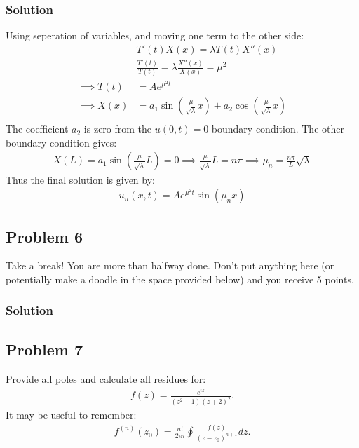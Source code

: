 \subsubsection*{Solution}
Using seperation of variables, and moving one term to the other side:
\begin{align*}
    &T'(t)X(x) = \lambda T(t)X''(x)\\
    &\frac{T'(t)}{T(t)} = \lambda \frac{X''(x)}{X(x)} = \mu^2\\
    \implies T(t) &= Ae^{\mu^2 t}\\
    \implies X(x) &= a_1\sin\left(\frac{\mu}{\sqrt{\lambda}} x\right) + a_2\cos\left(\frac{\mu}{\sqrt{\lambda}} x\right)\\
\end{align*}The coefficient $a_2$ is zero from the $u(0,t) = 0$ boundary condition. The other boundary condition gives:
\begin{align*}
    X(L) = a_1\sin\left(\frac{\mu}{\sqrt{\lambda}} L\right) = 0\implies \frac{\mu}{\sqrt{\lambda}}L = n\pi\implies \mu_n = \frac{n\pi}{L}\sqrt{\lambda}
\end{align*}Thus the final solution is given by:
\begin{align*}
    u_n(x,t) = Ae^{\mu^2t}\sin\left(\mu_nx\right)
\end{align*}
\subsection*{Problem 6}
Take a break! You are more than halfway done. Don't put anything here (or potentially make a doodle in the space provided below) and you receive 5 points.

\subsubsection*{Solution}

\subsection*{Problem 7}
Provide all poles and calculate all residues for:
\begin{align*}
    f(z) = \frac{e^{iz}}{(z^2 + 1)(z+2)^2}.
\end{align*}It may be useful to remember:
\begin{align*}
    f^{(n)}(z_0) = \frac{n!}{2\pi i}\oint \frac{f(z)}{(z -z_0)^{n+1}}dz.
\end{align*}


